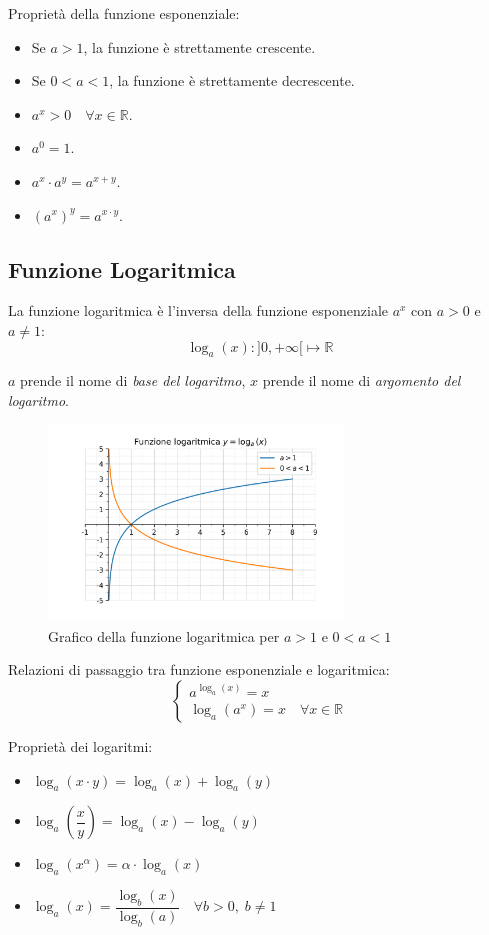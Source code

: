 \documentclass[oneside,10pt]{book} %
\newcommand{\R}{\mathbb{R}}
\begin{document}
Proprietà della funzione esponenziale:
\begin{itemize}
  \item Se $a > 1$, la funzione è strettamente crescente.
  \item Se $0 < a < 1$, la funzione è strettamente decrescente.
  \item $a^x > 0 \quad \forall x \in \mathbb{R}$.
  \item $a^0 = 1$.
  \item $a^x \cdot a^y = a^{x + y}$.
  \item $(a^x)^y = a^{x \cdot y}$.
\end{itemize}


\subsection{Funzione Logaritmica}

La funzione logaritmica è l'inversa della funzione esponenziale $a^x$ con $a > 0$ e $a \neq 1$:
\[
  \log_a(x): ]0, +\infty[ \mapsto \R
\]

$a$ prende il nome di \textit{base del logaritmo},  
$x$ prende il nome di \textit{argomento del logaritmo}.

\begin{figure}[H]
  \centering
  \includegraphics[width=0.7\textwidth]{./img/logaritmica.png}
  \caption{Grafico della funzione logaritmica per $a>1$ e $0<a<1$}
  \label{fig:funzione_logaritmica}
\end{figure}
\FloatBarrier

Relazioni di passaggio tra funzione esponenziale e logaritmica:
\[
\left\{
\begin{array}{l}
a^{\log_a(x)} = x \\
\log_a(a^x) = x \quad \forall x \in \R
\end{array}
\right.
\]

Proprietà dei logaritmi:
\begin{itemize}
  \item $\log_a(x \cdot y) = \log_a(x) + \log_a(y)$
  \item $\log_a\!\left(\dfrac{x}{y}\right) = \log_a(x) - \log_a(y)$
  \item $\log_a(x^{\alpha}) = \alpha \cdot \log_a(x)$
  \item $\log_a(x) = \dfrac{\log_b(x)}{\log_b(a)} \quad \forall b > 0, \; b \neq 1$
  \end{itemize}
\end{document}
